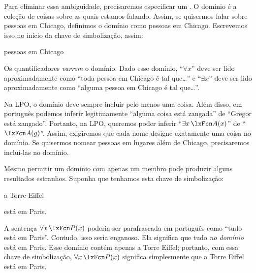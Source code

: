 Para eliminar essa ambiguidade, precisaremos especificar um . O domínio é a coleção de coisas sobre as quais estamos falando. Assim, se quisermos falar sobre pessoas em Chicago, definimos o domínio como pessoas em Chicago. Escrevemos isso no início da chave de simbolização, assim:
	\begin{ekey}
		\item[\text{domínio}] pessoas em Chicago
	\end{ekey}
Os quantificadores \emph{varrem} o domínio. Dado esse domínio, \textquotedblleft $\forall x$\textquotedblright{} deve ser lido aproximadamente como \textquotedblleft toda pessoa em Chicago é tal que\ldots\textquotedblright{} e \textquotedblleft $\exists x$\textquotedblright{} deve ser lido aproximadamente como \textquotedblleft alguma pessoa em Chicago é tal que\ldots\textquotedblright{}.


Na LPO, o domínio deve sempre incluir pelo menos uma coisa. Além disso, em português podemos inferir legitimamente \textquotedblleft alguma coisa está zangada\textquotedblright{} de \textquotedblleft Gregor está zangado\textquotedblright{}. Portanto, na LPO, queremos poder inferir \textquotedblleft $\exists x\,\atom{A}{x}$\textquotedblright{} de \textquotedblleft $\atom{A}{g}$\textquotedblright{}. Assim, exigiremos que cada nome designe exatamente uma coisa no domínio. Se quisermos nomear pessoas em lugares além de Chicago, precisaremos incluí-las no domínio.

Mesmo permitir um domínio com apenas um membro pode produzir alguns resultados estranhos. Suponha que tenhamos esta chave de simbolização:
\begin{ekey}
\item[\text{domínio}] a Torre Eiffel
\item[\atom{P}{x}]  está em Paris.
\end{ekey}
A sentença $\forall x\,\atom{P}{x}$ poderia ser parafraseada em português como \textquotedblleft tudo está em Paris\textquotedblright{}. Contudo, isso seria enganoso. Ela significa que tudo \emph{no domínio} está em Paris. Esse domínio contém apenas a Torre Eiffel; portanto, com essa chave de simbolização, $\forall x\,\atom{P}{x}$ significa simplesmente que a Torre Eiffel está em Paris.

